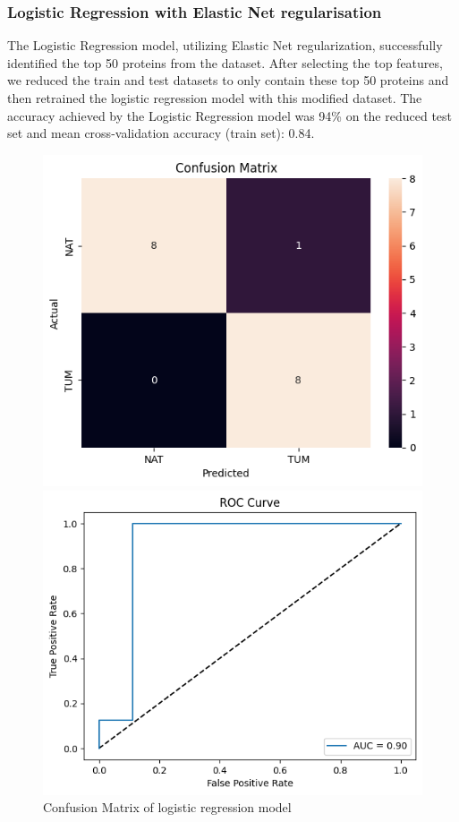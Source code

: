 \documentclass[a4paper,12pt]{article}
\begin{document}
\subsubsection{Logistic Regression with Elastic Net regularisation}
The Logistic Regression model, utilizing Elastic Net regularization, successfully identified the top 50 proteins from the dataset. After selecting the top features, we reduced the train and test datasets to only contain these top 50 proteins and then retrained the logistic regression model with this modified dataset. The accuracy achieved by the Logistic Regression model was 94\% on the reduced test set and mean cross-validation accuracy (train set): 0.84.

\begin{figure}[H]
	\centering
	\begin{minipage}[b]{0.45\textwidth}
		\centering
		\includegraphics[width=\textwidth]{images/lc.png}
		\caption{Confusion Matrix of logistic regression model}
		\label{fig:confusion_matrix_logreg}
	\end{minipage}
	\hfill
	\begin{minipage}[b]{0.45\textwidth}
		\centering
		\includegraphics[width=\textwidth]{images/lr.png}

\end{minipage}
\end{figure}
\end{document}
